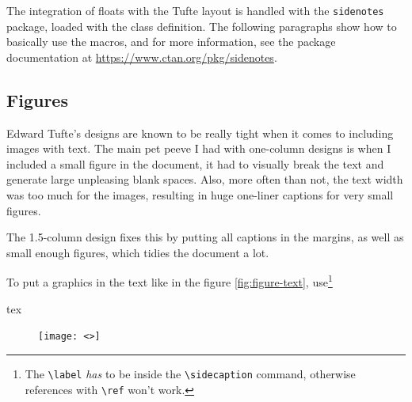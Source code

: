 The integration of floats with the Tufte layout is handled with the \texttt{sidenotes} package, loaded with the class definition. The following paragraphs show how to basically use the macros, and for more information, see the package documentation at \url{https://www.ctan.org/pkg/sidenotes}.

\subsection{Figures}

Edward Tufte's designs are known to be really tight when it comes to including images with text. The main pet peeve I had with one-column designs is when I included a small figure in the document, it had to visually break the text and generate large unpleasing blank spaces. Also, more often than not, the text width was too much for the images, resulting in huge one-liner captions for very small figures.

The 1.5-column design fixes this by putting all captions in the margins, as well as small enough figures, which tidies the document a lot.




To put a graphics in the text like in the figure \ref{fig:figure-text}, use\footnote{The \texttt{\textbackslash label} \textit{has} to be inside the \texttt{\textbackslash sidecaption} command, otherwise references with \texttt{\textbackslash ref} won't work.}

\begin{codebox}{tex}
    \begin{figure}
        \texttt{[image: <>]} %
    \end{figure}
\end{codebox}


